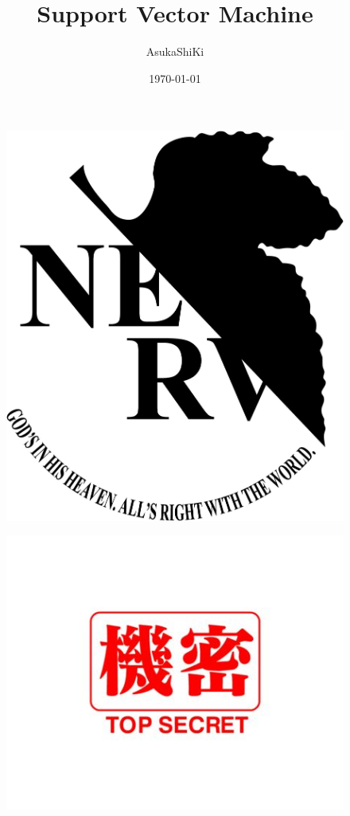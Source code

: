 \documentclass[UTF8]{ctexart}
\title{Support Vector Machine}
\author{AsukaShiKi}
\date{\today}
\begin{document}
\maketitle
\par
\begin{figure}[ht]
    \centering
    \includegraphics[scale=0.15]{01.jpg}
\end{figure}
\begin{figure}[ht]
    \centering
    \includegraphics[scale=0.5]{02.jpg}
\end{figure}
\end{document}
